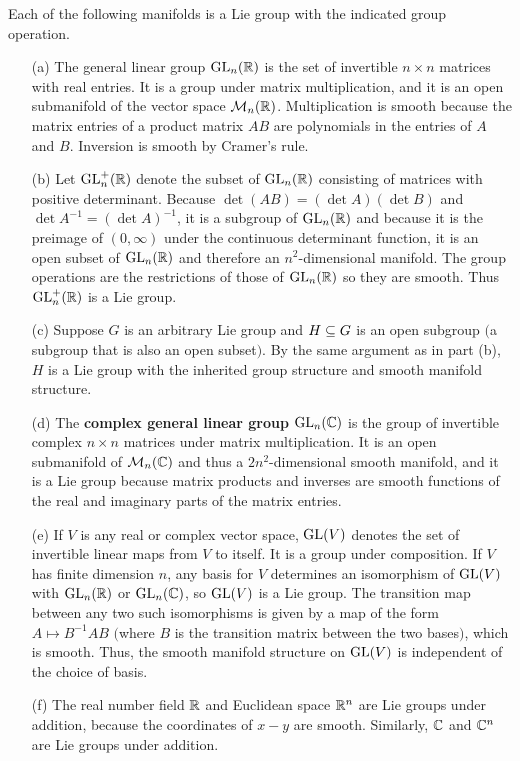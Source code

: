 \begin{example}
Each of the following manifolds is a Lie group with the indicated group operation.
\begin{itemize}
\item[(a)] The general linear group $\mathrm{GL}_n(\mathbb{R})$ is the set of invertible $n\times n$ matrices with real entries. It is a group under matrix multiplication, and it is an open submanifold of the vector space $\mathcal{M}_n(\mathbb{R})$. Multiplication is smooth because the matrix entries of a product matrix $AB$ are polynomials in the entries of $A$ and $B$. Inversion is smooth by Cramer's rule.
\item[(b)] Let $\mathrm{GL}^+_n(\mathbb{R})$ denote the subset of $\mathrm{GL}_n(\mathbb{R})$ consisting of matrices with positive determinant. Because $\det(AB)=(\det A)(\det B)$ and $\det A^{-1}=(\det A)^{-1}$, it is a subgroup of $\mathrm{GL}_n(\mathbb{R})$ and because it is the preimage of $(0,\infty)$ under the continuous determinant function, it is an open subset of $\mathrm{GL}_n(\mathbb{R})$ and therefore an $n^2$-dimensional manifold. The group operations are the restrictions of those of $\mathrm{GL}_n(\mathbb{R})$ so they are smooth. Thus $\mathrm{GL}^+_n(\mathbb{R})$ is a Lie group.
\item[(c)] Suppose $G$ is an arbitrary Lie group and $H\subseteq G$ is an open subgroup $($a subgroup that is also an open subset$)$. By the same argument as in part (b), $H$ is a Lie group with the inherited group structure and smooth manifold structure.
\item[(d)] The \textbf{complex general linear group} $\mathrm{GL}_n(\mathbb{C})$ is the group of invertible complex $n\times n$ matrices under matrix multiplication. It is an open submanifold of $\mathcal{M}_n(\mathbb{C})$ and thus a $2n^2$-dimensional smooth manifold, and it is a Lie group because matrix products and inverses are smooth functions of the real and imaginary parts of the matrix entries.
\item[(e)] If $V$ is any real or complex vector space, $\mathrm{GL}(V)$ denotes the set of invertible linear maps from $V$ to itself. It is a group under composition. If $V$ has finite dimension $n$, any basis for $V$ determines an isomorphism of $\mathrm{GL}(V)$ with $\mathrm{GL}_n(\mathbb{R})$ or $\mathrm{GL}_n(\mathbb{C})$, so $\mathrm{GL}(V)$ is a Lie group. The transition map between any two such isomorphisms is given by a map of the form $A\mapsto B^{-1}AB$ $($where $B$ is the transition matrix between the two bases$)$, which is smooth. Thus, the smooth manifold structure on $\mathrm{GL}(V)$ is independent of the choice of basis.
\item[(f)] The real number field $\mathbb{R}$ and Euclidean space $\mathbb{R}^n$ are Lie groups under addition, because the coordinates of $x-y$ are smooth. Similarly, $\mathbb{C}$ and $\mathbb{C}^n$ are Lie groups under addition.

\end{itemize}
\end{example}
